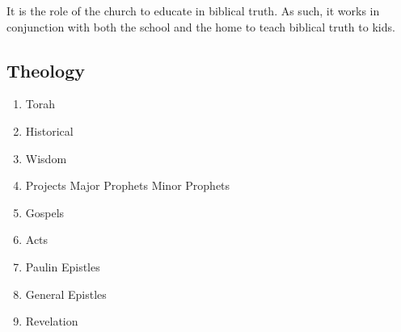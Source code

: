 \documentclass[CSHFoundation.tex]{subfiles}
\begin{document}
It is the role of the church to educate in biblical truth. As such, it works in conjunction with both the school and the home to teach biblical truth to kids.

\subsection{Theology}

\begin{enumerate}
\item Torah
\item Historical
\item Wisdom
\item Projects
\subitem Major Prophets
\subitem Minor Prophets
\item Gospels
\item Acts
\item Paulin Epistles
\item General Epistles
\item Revelation
\end{enumerate}
\end{document}
